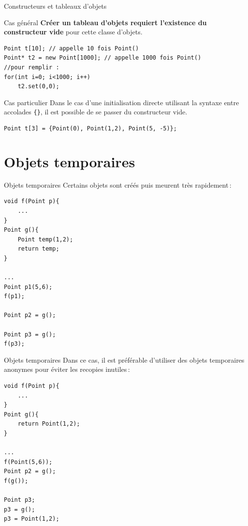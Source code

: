 \begin{frame}[fragile=singleslide]{Constructeurs et tableaux d'objets}
    \begin{block}{Cas général}
        \textbf{Créer un tableau d'objets requiert l'existence du constructeur vide} pour cette classe d'objets.
    \end{block}
    
        \begin{verbatim}
Point t[10]; // appelle 10 fois Point()
Point* t2 = new Point[1000]; // appelle 1000 fois Point()
//pour remplir :
for(int i=0; i<1000; i++)
    t2.set(0,0);
        \end{verbatim}
    
    \begin{exampleblock}{Cas particulier}
        Dans le cas d'une initialisation directe utilisant la syntaxe entre accolades \texttt{\{\}}, il est possible de se passer du constructeur vide.
    \end{exampleblock}
    
        \begin{verbatim}
Point t[3] = {Point(0), Point(1,2), Point(5, -5)};
        \end{verbatim}
\end{frame}

\section{Objets temporaires}
\begin{frame}[fragile=singleslide]{Objets temporaires}
Certains objets sont créés puis meurent très rapidement\,:
    \begin{verbatim}
void f(Point p){
    ...
}
Point g(){
    Point temp(1,2);
    return temp;
}

...
Point p1(5,6);
f(p1);

Point p2 = g();

Point p3 = g();
f(p3);
    \end{verbatim}
\end{frame}

\begin{frame}[fragile=singleslide]{Objets temporaires}
    Dans ce cas, il est préférable d'utiliser des objets temporaires anonymes pour éviter les recopies inutiles\,:
        \begin{verbatim}
void f(Point p){
    ...
}
Point g(){
    return Point(1,2);
}

...
f(Point(5,6));
Point p2 = g();
f(g());

Point p3;
p3 = g();
p3 = Point(1,2);
        \end{verbatim}
\end{frame}

